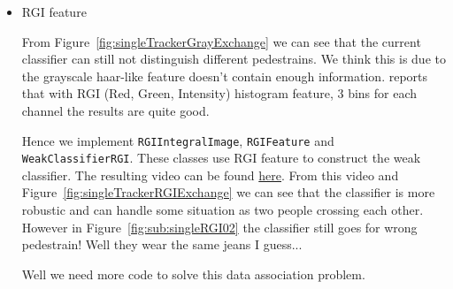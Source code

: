 \documentclass[a4paper]{article}
\begin{document}
\begin{enumerate}
\begin{itemize}
\begin{itemize}
\end{itemize}

\item RGI feature

From Figure~\ref{fig:singleTrackerGrayExchange} we can see that the current classifier can still not distinguish different pedestrains. We think this is due to the grayscale haar-like feature doesn't contain enough information. \cite{eth_biwi_00633} reports that with RGI (Red, Green, Intensity) histogram feature, 3 bins for each channel the results are quite good. 

Hence we implement \lstinline{RGIIntegralImage}, \lstinline{RGIFeature} and \lstinline{WeakClassifierRGI}. These classes use RGI feature to construct the weak classifier. The resulting video can be found \href{https://zerowong.github.io/PedestrainCounting/results/singleTrackerTestRGI01.avi}{here}. From this video and Figure~\ref{fig:singleTrackerRGIExchange} we can see that the classifier is more robustic and can handle some situation as two people crossing each other. However in Figure~\ref{fig:sub:singleRGI02} the classifier still goes for wrong pedestrain! Well they wear the same jeans I guess...

Well we need more code to solve this data association problem.


\end{itemize}
\end{enumerate}
\end{document}
